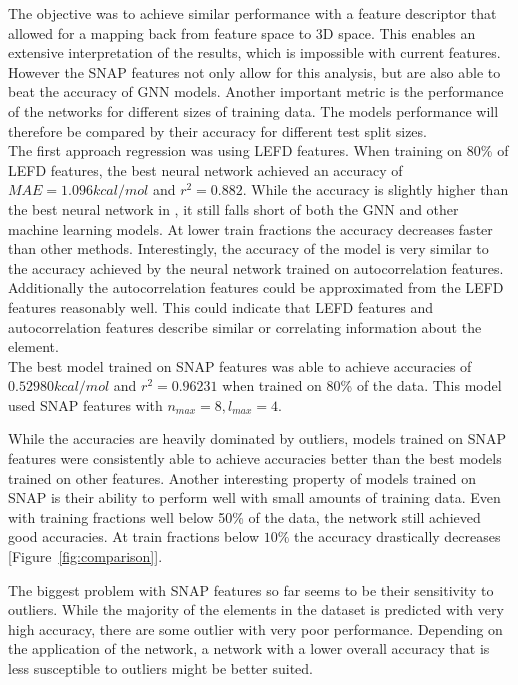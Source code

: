 The objective was to achieve similar performance with a feature descriptor that allowed for a mapping back from feature space to 3D space.
This enables an extensive interpretation of the results, which is impossible with current features.
However the SNAP features not only allow for this analysis, but are also able to beat the accuracy of GNN models.
Another important metric is the performance of the networks for different sizes of training data.
The models performance will therefore be compared by their accuracy for different test split sizes.
\\
The first approach regression was using LEFD features.
When training on 80\% of LEFD features, the best neural network achieved an accuracy of $MAE = 1.096 kcal/mol$ and $r^2=0.882$.
While the accuracy is slightly higher than the best neural network in \cite{friederich_dos}, it still falls short 
of both the GNN and other machine learning models.
At lower train fractions the accuracy decreases faster than other methods.
Interestingly, the accuracy of the model is very similar to the accuracy achieved by the neural network trained on autocorrelation 
features.
Additionally the autocorrelation features could be approximated from the LEFD features reasonably well.
This could indicate that LEFD features and autocorrelation features describe
similar or correlating information about the element.
\\
The best model trained on SNAP features was able to achieve accuracies of $0.52980 kcal/mol$ and
$r^2 = 0.96231$ when trained on 80\% of the data.
This model used SNAP features with $n_{max}=8, l_{max}=4$.

While the accuracies are heavily dominated by outliers, models trained on SNAP features were consistently
able to achieve accuracies better than the best models trained on other features.
Another interesting property of models trained on SNAP is their ability to perform well with small amounts 
of training data.
Even with training fractions well below 50\% of the data, the network still achieved good accuracies.
At train fractions below $10\%$ the accuracy drastically decreases [Figure~\ref{fig:comparison}].

The biggest problem with SNAP features so far seems to be their sensitivity to outliers.
While the majority of the elements in the dataset is predicted with very high accuracy, 
there are some outlier with very poor performance.
Depending on the application of the network, a network with a lower overall accuracy 
that is less susceptible to outliers might be better suited.

